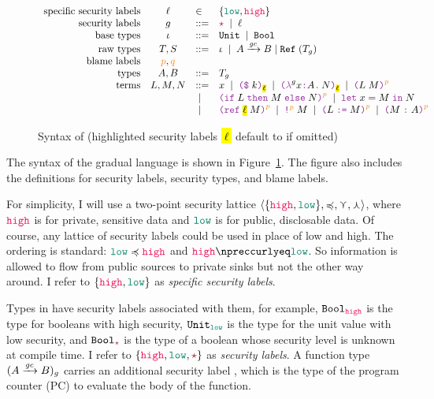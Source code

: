 \begin{figure}[tbp]
\raggedright
  {\small
  \[
  \begin{array}{rcll}
    \text{specific security labels} & \ell & \in & \{ \low , \high \} \\
    \text{security labels}  & g    & ::= & \unk \MID \ell \\
    \text{base types}               & \iota     & ::= & \Unit \MID \Bool \\
    \text{raw types}                & T, S      & ::= & \iota \MID \Fun{A}{\gc}{B} \mid \Refer{(T_g)} \\
    \text{blame labels}         & \bl{p}, \bl{q}     &      & \\
    \text{types}                    & A, B      & ::= & T_g \\
    \text{terms}                & L , M , N & ::=  & x \MID \const{k}{\text{\hl{$\ell$}}} \MID \lam{g}{x}{A}{N}{\text{\hl{$\ell$}}} \MID \app{L}{M}{p} \\
    &                                       & \MID & \ifexp{L}{M}{N}{p} \MID \letexp{x}{M}{N} \\
    &                                       & \MID & \refexp{\text{\hl{$\ell$}}}{M}{p} \MID \deref{M}{p} \MID \assign{L}{M}{p} \MID \ann{M}{A}{p}
  \end{array}
  \]}
  \caption{Syntax of \Surface (highlighted security labels \hl{$\ell$} default to \low if omitted)}
  \label{fig:surface-syntax}
\end{figure}

The syntax of the gradual language \Surface is shown in
Figure~\ref{fig:surface-syntax}. The figure also includes the definitions for
security labels, security types, and blame labels.

For simplicity, I will use a two-point security lattice $\langle \{\high, \low\}
, \preccurlyeq, \curlyvee , \curlywedge \rangle$, where $\high$ is for private,
sensitive data and $\low$ is for public, disclosable data. Of course, any
lattice of security labels could be used in place of low and high. The ordering
is standard: $\low \preccurlyeq \high$ and $\high \npreccurlyeq \low$. So
information is allowed to flow from public sources to private sinks but not the
other way around. I refer to $\{\high,\low\}$ as \emph{specific security
labels}.

Types in \Surface have security labels associated with them, for example,
$\Bool_{\high}$ is the type for booleans with high security, $\Unit_{\low}$ is
the type for the unit value with low security, and $\Bool_{\unk}$ is the type of
a boolean whose security level is unknown at compile time. I refer to
$\{\high,\low,\unk\}$ as \emph{security labels}. A function type
$({A}\xrightarrow{{\mathit{gc}}}{B})_g$ carries an additional security label \gc, which is the
type of the program counter (PC) to evaluate the body of the function.

